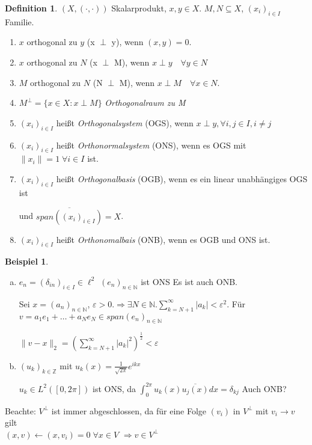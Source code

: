 \documentclass[ngerman]{report}
\theoremstyle{plain}%
\theoremstyle{definition}%
\newtheorem{definition}[thm]{Definition}
\newtheorem{bsp}[thm]{Beispiel}
\theoremstyle{myStyle}
\newcommand{\Z}{\mathbb{Z}}
\newcommand{\N}{\mathbb{N}}
\newcommand{\norm}[1]{\|#1\|}
\newcommand{\df}[1][]{%
	\overset{#1}{\Rightarrow}
}
\newcommand{\xf}{(x_i)_{i\in I}}
\newcommand{\ff}[3]{(#1_#2)_{#2\in#3}}
\newcommand{\SP}{(\cdot,\cdot)}
\begin{document}
	\begin{definition}
		$(X,\SP)$ Skalarprodukt, $x,y\in X$. $M,N \subseteq X$, $(x_i)_{i\in I}$ Familie.
		\begin{enumerate}
			\item $x$ orthogonal zu $y$ (x $\perp$ y), wenn $(x,y) = 0$.
			\item $x$ orthogonal zu $N$ (x $\perp$ M), wenn $x \perp y\quad \forall y\in N$
			\item $M$ orthogonal zu $N$ (N $\perp$ M), wenn $x \perp M\quad \forall x\in N$.
			\item $M^\perp = \{x\in X: x\perp M\}$ \textit{Orthogonalraum zu M}
			\item $\xf$ heißt \textit{Orthogonalsystem} (OGS), wenn $x \perp y, \forall i,j \in I, i\neq j$
			\item $\xf$ heißt \textit{Orthonormalsystem} (ONS), wenn es OGS mit $\|x_i \| = 1 \; \forall i \in I$ ist. 
			\item $\xf$ heißt \textit{Orthogonalbasis} (OGB), wenn es ein linear unabhängiges OGS ist \par und $\overline{span(\xf)} = X$.
			\item $\xf$ heißt \textit{Orthonomalbais} (ONB), wenn es OGB und ONS ist.	
		\end{enumerate}
	\end{definition}
	\begin{bsp}
		\begin{enumerate}[a)]
			\item $e_n = (\delta_{in})_{i\in I} \in \ell^2$ $(e_n)_{n\in \N}$ ist ONS
			Es ist auch ONB.\par
			Sei $x = (a_n)_{n\in \N}$, $\varepsilon > 0. \df \exists N \in \N. \sum_{k=N+1}^\infty |a_k| < \varepsilon^2$.
			Für $v = a_1e_1 + \dots + a_Ne_N \in span(e_n)_{n\in\N}$ \par
			$\norm{v - x }_2 = \left( \sum_{k = N +1}^\infty |a_k|^2\right)^{\frac{1}{2}} < \varepsilon$

			\item $\ff{u}{k}{\Z}$ mit $u_k(x) = \frac{1}{\sqrt{2\pi}} e^{ikx}$ \par
			$u_k \in L^2([0,2\pi])$ ist ONS, da $\int_0^{2\pi} u_k(x) \overline{u_j(x)} dx = \delta_{kj}$ Auch ONB?
		\end{enumerate}
		Beachte: $V^\perp$ ist immer abgeschlossen, da für eine Folge $(v_i)$ in $V^\perp$ mit $v_i \to v$ gilt\\ $(x,v) \leftarrow (x,v_i) = 0 \; \forall x\in V$ $\df v \in V^\perp$
	\end{bsp}
\end{document}
